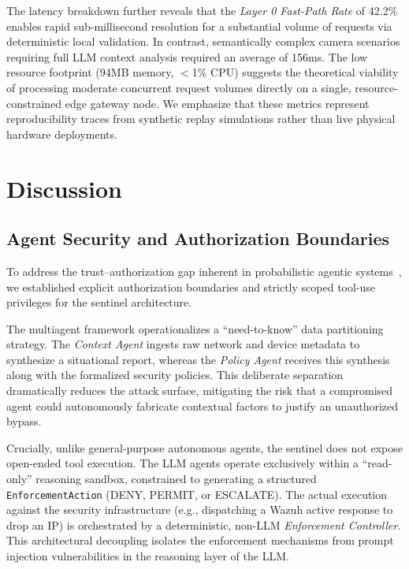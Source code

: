 \documentclass[
]{ceurart}
\begin{document}
The latency breakdown further reveals that the \textit{Layer 0 Fast-Path Rate} of 42.2\% enables rapid sub-millisecond resolution for a substantial volume of requests via deterministic local validation. In contrast, semantically complex camera scenarios requiring full LLM context analysis required an average of 156ms. The low resource footprint (94MB memory, $<$1\% CPU) suggests the theoretical viability of processing moderate concurrent request volumes directly on a single, resource-constrained edge gateway node. We emphasize that these metrics represent reproducibility traces from synthetic replay simulations rather than live physical hardware deployments.


\section{Discussion}

\subsection{Agent Security and Authorization Boundaries}

To address the trust--authorization gap inherent in probabilistic agentic systems~\cite{nistai2024}, we established explicit authorization boundaries and strictly scoped tool-use privileges for the sentinel architecture.

The multiagent framework operationalizes a ``need-to-know'' data partitioning strategy. The \textit{Context Agent} ingests raw network and device metadata to synthesize a situational report, whereas the \textit{Policy Agent} receives this synthesis along with the formalized security policies. This deliberate separation dramatically reduces the attack surface, mitigating the risk that a compromised agent could autonomously fabricate contextual factors to justify an unauthorized bypass.

Crucially, unlike general-purpose autonomous agents, the sentinel does not expose open-ended tool execution. The LLM agents operate exclusively within a ``read-only'' reasoning sandbox, constrained to generating a structured \texttt{EnforcementAction} (DENY, PERMIT, or ESCALATE). The actual execution against the security infrastructure (e.g., dispatching a Wazuh active response to drop an IP) is orchestrated by a deterministic, non-LLM \textit{Enforcement Controller}. This architectural decoupling isolates the enforcement mechanisms from prompt injection vulnerabilities in the reasoning layer of the LLM.
\end{document}

